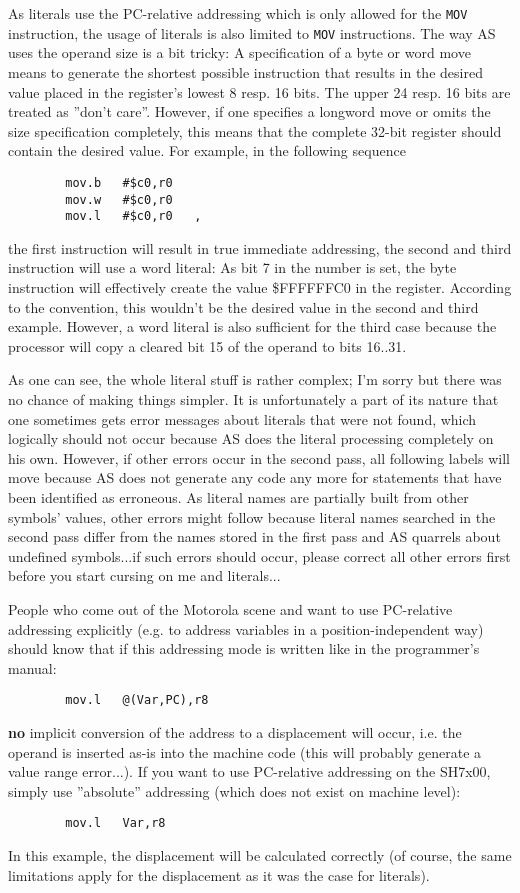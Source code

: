 \documentclass[12pt,twoside]{report}
\newcommand{\bb}[1]{{\bf #1}}
\newcommand{\tty}[1]{{\tt #1}}
\begin{document}
As literals use the PC-relative addressing which is only allowed for
the \tty{MOV} instruction, the usage of literals is also limited to
\tty{MOV} instructions.  The way AS uses the operand size is a bit tricky:
A specification of a byte or word move means to generate the shortest
possible instruction that results in the desired value placed in the
register's lowest 8 resp. 16 bits.  The upper 24 resp. 16 bits are treated
as ''don't care''.  However, if one specifies a longword move or omits the
size specification completely, this means that the complete 32-bit
register should contain the desired value.  For example, in the following
sequence
\begin{verbatim}
        mov.b   #$c0,r0
        mov.w   #$c0,r0
        mov.l   #$c0,r0   ,
\end{verbatim}
the first instruction will result in true immediate addressing, the
second and third instruction will use a word literal:  As bit 7 in
the number is set, the byte instruction will effectively create the
value \$FFFFFFC0 in the register.  According to the convention, this
wouldn't be the desired value in the second and third example.
However, a word literal is also sufficient for the third case because
the processor will copy a cleared bit 15 of the operand to bits
16..31.

As one can see, the whole literal stuff is rather complex; I'm sorry but
there was no chance of making things simpler.  It is unfortunately a
part of its nature that one sometimes gets error messages about
literals that were not found, which logically should not occur because
AS does the literal processing completely on his own.  However, if
other errors occur in the second pass, all following labels will move
because AS does not generate any code any more for statements that
have been identified as erroneous.  As literal names are partially built
from other symbols' values, other errors might follow because literal
names searched in the second pass differ from the names stored in the
first pass and AS quarrels about undefined symbols...if such errors
should occur, please correct all other errors first before you start
cursing on me and literals...

People who come out of the Motorola scene and want to use PC-relative
addressing explicitly (e.g. to address variables in a position-independent
way) should know that if this addressing mode is written like in the
programmer's manual:
\begin{verbatim}
        mov.l   @(Var,PC),r8
\end{verbatim}
\bb{no} implicit conversion of the address to a displacement will occur,
i.e. the operand is inserted as-is into the machine code (this will
probably generate a value range error...).  If you want to use
PC-relative addressing on the SH7x00, simply use ''absolute''
addressing (which does not exist on machine level):
\begin{verbatim}
        mov.l   Var,r8
\end{verbatim}
In this example, the displacement will be calculated correctly (of
course, the same limitations apply for the displacement as it was the
case for literals).
\end{document}
